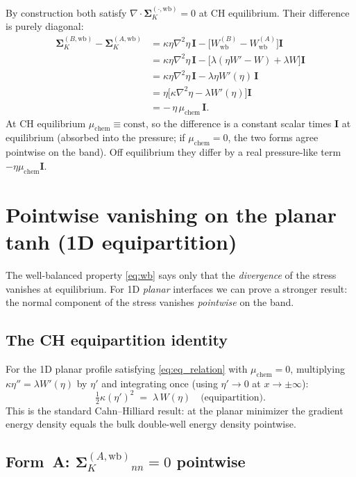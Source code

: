 \documentclass[11pt]{article}
\newcommand{\dive}{\nabla\!\cdot\!}
\newcommand{\grad}{\nabla}
\newcommand{\II}{\mathbf{I}}
\newcommand{\SK}{\boldsymbol{\Sigma}_K}
\newcommand{\Wb}{W_{\!\mathrm{wb}}}
\begin{document}
By construction both satisfy $\dive\SK^{(\cdot,\mathrm{wb})}=0$ at CH
equilibrium. Their difference is purely diagonal:
\begin{align}
\SK^{(B,\mathrm{wb})} - \SK^{(A,\mathrm{wb})}
   &= \kappa\eta\grad^2\eta\,\II - \big[\Wb^{(B)} - \Wb^{(A)}\big]\II \nonumber\\
   &= \kappa\eta\grad^2\eta\,\II - \big[\lambda(\eta W' - W) + \lambda W\big]\II \nonumber\\
   &= \kappa\eta\grad^2\eta\,\II - \lambda\eta W'(\eta)\,\II \nonumber\\
   &= \eta\big[\kappa\grad^2\eta - \lambda W'(\eta)\big]\II \nonumber\\
   &= -\,\eta\,\mu_{\mathrm{chem}}\,\II.
\label{eq:diff}
\end{align}
At CH equilibrium $\mu_{\mathrm{chem}}\equiv\mathrm{const}$, so the
difference is a constant scalar times $\II$ at equilibrium (absorbed into
the pressure; if $\mu_{\mathrm{chem}}=0$, the two forms agree pointwise on
the band). Off equilibrium they differ by a real pressure-like term
$-\eta\mu_{\mathrm{chem}}\II$.

\section{Pointwise vanishing on the planar tanh (1D equipartition)}

The well-balanced property \eqref{eq:wb} says only that the
\emph{divergence} of the stress vanishes at equilibrium. For 1D
\emph{planar} interfaces we can prove a stronger result: the normal
component of the stress vanishes \emph{pointwise} on the band.

\subsection{The CH equipartition identity}

For the 1D planar profile satisfying \eqref{eq:eq_relation} with
$\mu_{\mathrm{chem}}=0$, multiplying $\kappa\eta''=\lambda W'(\eta)$ by
$\eta'$ and integrating once (using $\eta'\to 0$ at $x\to\pm\infty$):
\begin{equation}
\boxed{\,\tfrac{1}{2}\kappa(\eta')^2 \;=\; \lambda\,W(\eta) \quad\text{(equipartition).}\,}
\label{eq:equipart}
\end{equation}
This is the standard Cahn--Hilliard result: at the planar minimizer the
gradient energy density equals the bulk double-well energy density pointwise.

\subsection{Form~A: \texorpdfstring{$\SK^{(A,\mathrm{wb})}_{nn}=0$ pointwise}{normal stress vanishes pointwise}}
\end{document}
